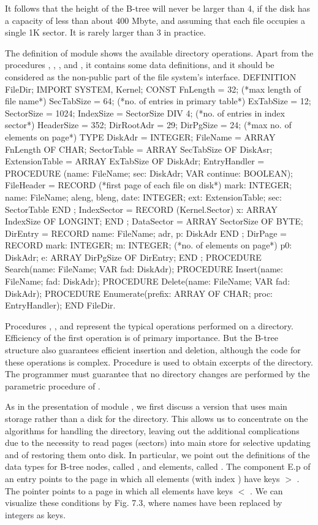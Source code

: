 It follows that the height of the B-tree will never be larger than 4, if the disk has a capacity of less than about 400 Mbyte, and assuming that each file occupies a single 1K sector. It is rarely larger than 3 in practice.

The definition of module  shows the available directory operations. Apart from the procedures , , , and , it contains some data definitions, and it should be considered as the non-public part of the file system's interface.
\begintt
DEFINITION FileDir; IMPORT SYSTEM, Kernel; CONST
FnLength = 32; (*max length of file name*) SecTabSize = 64; (*no. of entries in primary table*) ExTabSize = 12;
SectorSize = 1024;
IndexSize = SectorSize DIV 4; (*no. of entries in index sector*) HeaderSize = 352;
DirRootAdr = 29;
DirPgSize = 24; (*max no. of elements on page*)
TYPE DiskAdr = INTEGER;
FileName = ARRAY FnLength OF CHAR;
SectorTable = ARRAY SecTabSize OF DiskAsr;
ExtensionTable = ARRAY ExTabSize OF DiskAdr;
EntryHandler = PROCEDURE (name: FileName; sec: DiskAdr; VAR continue: BOOLEAN);
FileHeader = RECORD (*first page of each file on disk*) mark: INTEGER;
name: FileName;
aleng, bleng, date: INTEGER; ext: ExtensionTable;
sec: SectorTable
END ;
IndexSector = RECORD (Kernel.Sector) x: ARRAY IndexSize OF LONGINT;
END ;
DataSector = ARRAY SectorSize OF BYTE;
DirEntry = RECORD name: FileName;
adr, p: DiskAdr END ;
DirPage = RECORD mark: INTEGER;
m: INTEGER; (*no. of elements on page*) p0: DiskAdr;
e: ARRAY DirPgSize OF DirEntry;
END ;
PROCEDURE Search(name: FileName; VAR fad: DiskAdr); PROCEDURE Insert(name: FileName; fad: DiskAdr);
PROCEDURE Delete(name: FileName; VAR fad: DiskAdr); PROCEDURE Enumerate(prefix: ARRAY OF CHAR; proc: EntryHandler);
END FileDir.
\endtt

\noindent Procedures , , and  represent the typical operations performed on a directory. Efficiency of the first operation is of primary importance. But the B-tree structure also guarantees efficient insertion and deletion, although the code for these operations is complex. Procedure  is used to obtain excerpts of the directory. The programmer must guarantee that no directory changes are performed by the parametric procedure of .

As in the presentation of module , we first discuss a version that uses main storage rather than a disk for the directory. This allows us to concentrate on the algorithms for handling the directory, leaving out the additional complications due to the necessity to read pages (sectors) into main store for selective updating and of restoring them onto disk. In particular, we point out the definitions of the data types for B-tree nodes, called , and elements, called . The component E.p of an entry  points to the page in which all elements (with index ) have keys  $>$ . The pointer  points to a page in which all elements have keys  $<$ . We can visualize these conditions by Fig. 7.3, where names have been replaced by integers as keys.

